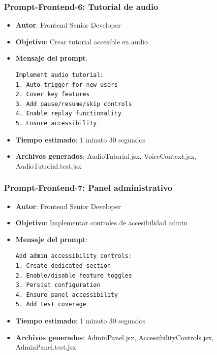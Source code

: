 \documentclass[12pt]{article}
\begin{document}
\subsubsection{Prompt-Frontend-6: Tutorial de audio}
\begin{itemize}
    \item \textbf{Autor}: Frontend Senior Developer
    \item \textbf{Objetivo}: Crear tutorial accesible en audio
    \item \textbf{Mensaje del prompt}:
    \begin{verbatim}
Implement audio tutorial:
1. Auto-trigger for new users
2. Cover key features
3. Add pause/resume/skip controls
4. Enable replay functionality
5. Ensure accessibility
    \end{verbatim}
    \item \textbf{Tiempo estimado}: 1 minuto 30 segundos
    \item \textbf{Archivos generados}: AudioTutorial.jsx, VoiceContext.jsx, AudioTutorial.test.jsx
\end{itemize}

\subsubsection{Prompt-Frontend-7: Panel administrativo}
\begin{itemize}
    \item \textbf{Autor}: Frontend Senior Developer
    \item \textbf{Objetivo}: Implementar controles de accesibilidad admin
    \item \textbf{Mensaje del prompt}:
    \begin{verbatim}
Add admin accessibility controls:
1. Create dedicated section
2. Enable/disable feature toggles
3. Persist configuration
4. Ensure panel accessibility
5. Add test coverage
    \end{verbatim}
    \item \textbf{Tiempo estimado}: 1 minuto 30 segundos
    \item \textbf{Archivos generados}: AdminPanel.jsx, AccessibilityControls.jsx, AdminPanel.test.jsx
\end{itemize}
\end{document}
